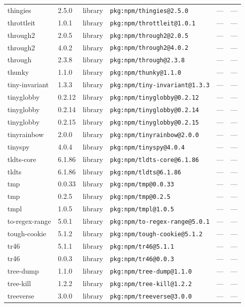 \documentclass[11pt]{article}
\begin{document}
\begin{longtable}{|l|l|l|p{2.2cm}|l|p{4cm}|}
thingies & 2.5.0 & library & \texttt{pkg:npm/thingies@2.5.0} & — & — \\
throttleit & 1.0.1 & library & \texttt{pkg:npm/throttleit@1.0.1} & — & — \\
through2 & 2.0.5 & library & \texttt{pkg:npm/through2@2.0.5} & — & — \\
through2 & 4.0.2 & library & \texttt{pkg:npm/through2@4.0.2} & — & — \\
through & 2.3.8 & library & \texttt{pkg:npm/through@2.3.8} & — & — \\
thunky & 1.1.0 & library & \texttt{pkg:npm/thunky@1.1.0} & — & — \\
tiny-invariant & 1.3.3 & library & \texttt{pkg:npm/tiny-invariant@1.3.3} & — & — \\
tinyglobby & 0.2.12 & library & \texttt{pkg:npm/tinyglobby@0.2.12} & — & — \\
tinyglobby & 0.2.14 & library & \texttt{pkg:npm/tinyglobby@0.2.14} & — & — \\
tinyglobby & 0.2.15 & library & \texttt{pkg:npm/tinyglobby@0.2.15} & — & — \\
tinyrainbow & 2.0.0 & library & \texttt{pkg:npm/tinyrainbow@2.0.0} & — & — \\
tinyspy & 4.0.4 & library & \texttt{pkg:npm/tinyspy@4.0.4} & — & — \\
tldts-core & 6.1.86 & library & \texttt{pkg:npm/tldts-core@6.1.86} & — & — \\
tldts & 6.1.86 & library & \texttt{pkg:npm/tldts@6.1.86} & — & — \\
tmp & 0.0.33 & library & \texttt{pkg:npm/tmp@0.0.33} & — & — \\
tmp & 0.2.5 & library & \texttt{pkg:npm/tmp@0.2.5} & — & — \\
tmpl & 1.0.5 & library & \texttt{pkg:npm/tmpl@1.0.5} & — & — \\
to-regex-range & 5.0.1 & library & \texttt{pkg:npm/to-regex-range@5.0.1} & — & — \\
tough-cookie & 5.1.2 & library & \texttt{pkg:npm/tough-cookie@5.1.2} & — & — \\
tr46 & 5.1.1 & library & \texttt{pkg:npm/tr46@5.1.1} & — & — \\
tr46 & 0.0.3 & library & \texttt{pkg:npm/tr46@0.0.3} & — & — \\
tree-dump & 1.1.0 & library & \texttt{pkg:npm/tree-dump@1.1.0} & — & — \\
tree-kill & 1.2.2 & library & \texttt{pkg:npm/tree-kill@1.2.2} & — & — \\
treeverse & 3.0.0 & library & \texttt{pkg:npm/treeverse@3.0.0} & — & — \\

\end{longtable}
\end{document}
